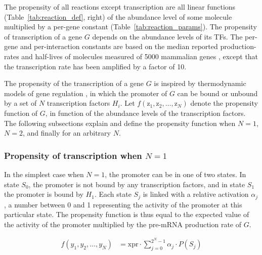 \documentclass[
  table,
  10pt,
  a4paper]{article}
\begin{document}
The propensity of all reactions except transcription are all linear
functions (Table~\ref{tab:reaction_def}, right) of the abundance level
of some molecule multiplied by a per-gene constant
(Table~\ref{tab:reaction_params}). The propensity of transcription of a
gene \(G\) depends on the abundance levels of its TFs. The per-gene and
per-interaction constants are based on the median reported
production-rates and half-lives of molecules measured of 5000 mammalian
genes \autocite{schwanhausser_globalquantificationmammalian_2011},
except that the transcription rate has been amplified by a factor of 10.

\newcommand{\proptran}{f}
\newcommand{\ai}[2]{$S_{#1} = S_{#2b}$}
\newcommand{\zk}[1]{\frac{y_#1}{k_#1}^{c_#1}}
\newcommand{\wi}[1]{\nu_#1}

The propensity of the transcription of a gene \(G\) is inspired by
thermodynamic models of gene regulation
\autocite{schilstra_biologicgeneexpression_2008}, in which the promoter
of \(G\) can be bound or unbound by a set of \(N\) transcription factors
\(H_i\). Let \(f(\text{z}_{1}, \text{z}_{2}, \ldots, \text{z}_{N})\)
denote the propensity function of \(G\), in function of the abundance
levels of the transcription factors. The following subsections explain
and define the propensity function when \(N=1\), \(N=2\), and finally
for an arbitrary \(N\).

\hypertarget{propensity-of-transcription-when-n1}{%
\subsubsection{\texorpdfstring{Propensity of transcription when
\(N=1\)}{Propensity of transcription when N=1}}\label{propensity-of-transcription-when-n1}}

In the simplest case when \(N=1\), the promoter can be in one of two
states. In state \(S_0\), the promoter is not bound by any transcription
factors, and in state \(S_1\) the promoter is bound by \(H_1\). Each
state \(S_j\) is linked with a relative activation \(\alpha_j\), a
number between 0 and 1 representing the activity of the promoter at this
particular state. The propensity function is thus equal to the expected
value of the activity of the promoter multiplied by the pre-mRNA
production rate of \(G\).

\begin{align}
  f(y_1, y_2, \ldots, y_N) & = \text{xpr} \cdot \sum_{j = 0}^{2^N - 1} \alpha_j \cdot P(S_j) \label{eqn:activ0} \\
\end{align}
\end{document}

